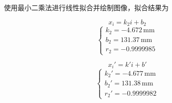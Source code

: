 \documentclass[10pt, twocolumn]{article}
\begin{document}
\par
使用最小二乘法进行线性拟合并绘制图像，拟合结果为\\
\begin{minipage}{0.23\textwidth}
    \begin{equation*}
        x_i=k_2i+b_2
    \end{equation*}
    \begin{equation*}
    \begin{cases}
        k_2 = -4.672\,\text{mm} \\
        b_2 = 131.37\,\text{mm} \\
        r_2 = -0.9999985
    \end{cases}
    \end{equation*}
\end{minipage}
\begin{minipage}{0.23\textwidth}
    \begin{equation*}
        x_i'=k'i+b'
    \end{equation*}
    \begin{equation*}
    \begin{cases}
        k_2' = -4.677\,\text{mm} \\
        b_2' = 131.38\,\text{mm} \\
        r_2' = -0.9999982
    \end{cases}
    \end{equation*}
\end{minipage}
\end{document}

